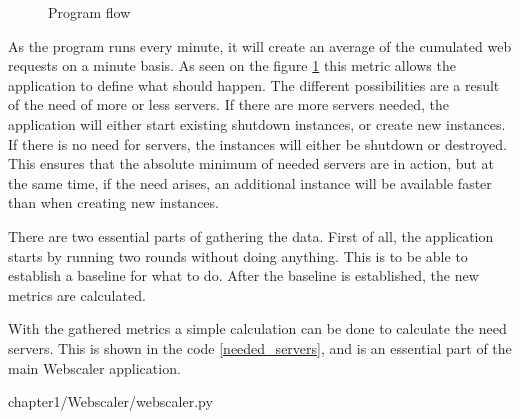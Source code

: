 \begin{figure}[htp]
\centering
{}
\caption{\label{fig:program_flow}Program flow}
\end{figure}

As the program runs every minute, it will create an average of the cumulated
web requests on a minute basis. As seen on the figure \ref{fig:program_flow}
this metric allows the application to define what should happen. The different
possibilities are a result of the need of more or less servers. If there are
more servers needed, the application will either start existing shutdown
instances, or create new instances. If there is no need for servers, the
instances will either be shutdown or destroyed. This ensures that the absolute
minimum of needed servers are in action, but at the same time, if the need
arises, an additional instance will be available faster than when creating new
instances.

There are two essential parts of gathering the data. First of all, the
application starts by running two rounds without doing anything. This is to be
able to establish a baseline for what to do. After the baseline is established,
the new metrics are calculated. 

With the gathered metrics a simple calculation can be done to calculate the
need servers. This is shown in the code \ref{needed_servers}, and is an
essential part of the main Webscaler application.

\begin{center}

{chapter1/Webscaler/webscaler.py}
\end{center}

